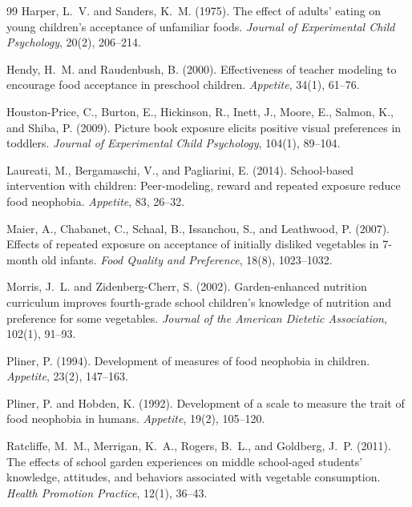 \documentclass[11pt]{article}
\theoremstyle{remark}
\begin{document}
\begin{thebibliography}{99}
Harper, L.~V. and Sanders, K.~M. (1975).
\newblock The effect of adults' eating on young children's acceptance of unfamiliar foods.
\newblock \emph{Journal of Experimental Child Psychology}, 20(2), 206--214.

Hendy, H.~M. and Raudenbush, B. (2000).
\newblock Effectiveness of teacher modeling to encourage food acceptance in preschool children.
\newblock \emph{Appetite}, 34(1), 61--76.

Houston-Price, C., Burton, E., Hickinson, R., Inett, J., Moore, E., Salmon, K., and Shiba, P. (2009).
\newblock Picture book exposure elicits positive visual preferences in toddlers.
\newblock \emph{Journal of Experimental Child Psychology}, 104(1), 89--104.

Laureati, M., Bergamaschi, V., and Pagliarini, E. (2014).
\newblock School-based intervention with children: Peer-modeling, reward and repeated exposure reduce food neophobia.
\newblock \emph{Appetite}, 83, 26--32.

Maier, A., Chabanet, C., Schaal, B., Issanchou, S., and Leathwood, P. (2007).
\newblock Effects of repeated exposure on acceptance of initially disliked vegetables in 7-month old infants.
\newblock \emph{Food Quality and Preference}, 18(8), 1023--1032.

Morris, J.~L. and Zidenberg-Cherr, S. (2002).
\newblock Garden-enhanced nutrition curriculum improves fourth-grade school children's knowledge of nutrition and preference for some vegetables.
\newblock \emph{Journal of the American Dietetic Association}, 102(1), 91--93.

Pliner, P. (1994).
\newblock Development of measures of food neophobia in children.
\newblock \emph{Appetite}, 23(2), 147--163.

Pliner, P. and Hobden, K. (1992).
\newblock Development of a scale to measure the trait of food neophobia in humans.
\newblock \emph{Appetite}, 19(2), 105--120.

Ratcliffe, M.~M., Merrigan, K.~A., Rogers, B.~L., and Goldberg, J.~P. (2011).
\newblock The effects of school garden experiences on middle school-aged students' knowledge, attitudes, and behaviors associated with vegetable consumption.
\newblock \emph{Health Promotion Practice}, 12(1), 36--43.


\end{thebibliography}
\end{document}
